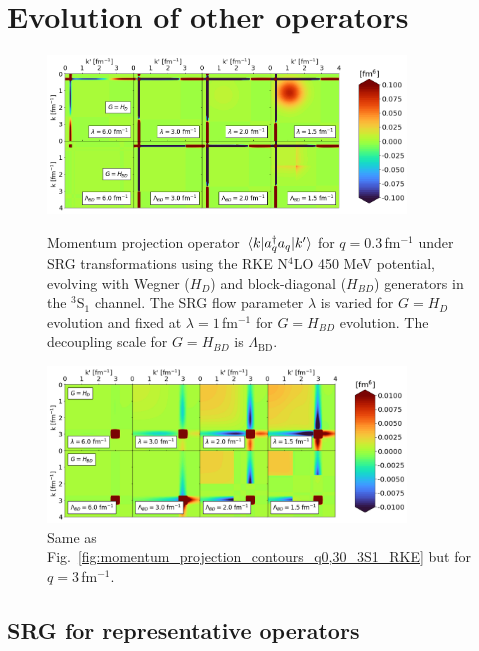 \documentclass[10pt,aps,prc,floatfix,twocolumn,nofootinbib]{revtex4-1}
\newcommand{\LambdaBD}{{\Lambda_{\text{BD}}}}
\newcommand{\ataq}{a^{\dagger}_q a_q}
\begin{document}
\section{Evolution of other operators}
\label{sec:evolution_other_operators}

%
\begin{figure}[t!]
	\includegraphics[clip,width=0.85\textwidth]{momentum_projection_contours_q0,30_kvnn_111_3S1.png}%
	\caption{Momentum projection operator $\mel{k}{\ataq}{k'}$ for $q=0.3$\,fm$^{-1}$ under SRG transformations using the RKE N$^4$LO 450 MeV potential, evolving with Wegner ($H_D$) and block-diagonal ($H_{BD}$) generators in the $^3$S$_1$ channel. The SRG flow parameter $\lambda$ is varied for $G = H_D$ evolution and fixed at $\lambda=1$\,fm$^{-1}$ for $G = H_{BD}$ evolution. The decoupling scale for $G = H_{BD}$ is $\LambdaBD$.}
	\label{fig:momentum_projection_contours_q0,30_3S1_RKE}

\medskip\smallskip

	\includegraphics[clip,width=0.85\textwidth]{momentum_projection_contours_q3,00_kvnn_111_3S1.png}%
	\caption{Same as Fig.~\ref{fig:momentum_projection_contours_q0,30_3S1_RKE} but for $q=3$\,fm$^{-1}$.}
	\label{fig:momentum_projection_contours_q3,00_3S1_RKE}
\end{figure}
%

\subsection{SRG for representative operators}
\label{subsec:representative_ops}
\end{document}

